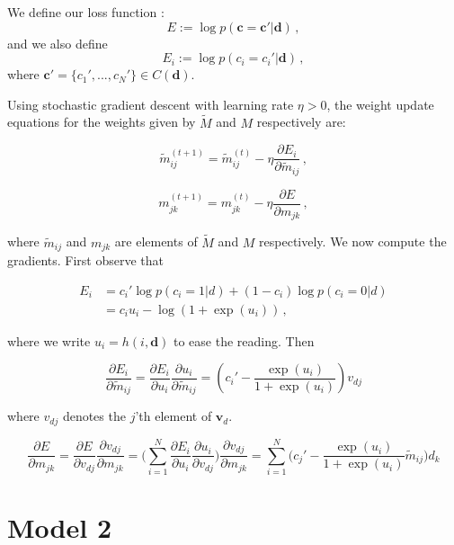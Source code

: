 \documentclass[12pt]{article}\pagestyle{myheadings}
\newcommand{\M}{\tilde{M}}
\newcommand{\tmij}{\tilde{m}_{ij}}
\newcommand{\mjk}{{m}_{jk}}
\newcommand{\boldc}{\boldsymbol c}
\newcommand{\boldd}{\boldsymbol d}
\newcommand{\boldvd}{\boldsymbol v_d}
\begin{document}
We define our loss function :
\begin{equation}
E := \log p(\boldc = \boldc'|\boldd) \,,
\end{equation}
and we also define
\begin{equation}
E_i := \log  p(c_i = c_i'|  \boldd) \,,
\end{equation} 
where $\boldc'= \{c_1',...,c_N'\} \in C(\boldd)$.

Using stochastic gradient descent with learning rate $\eta > 0$, the weight update equations for the weights given by $\M$ and $M$ respectively are:

\[
\tmij^{(t+1)} = \tmij^{(t)} - \eta \frac{\partial E_i}{\partial \tmij} \,,
\]

\[
\mjk^{(t+1)} = \mjk^{(t)} - \eta \frac{\partial E}{\partial \mjk} \,,
\]

where $\tmij$ and $\mjk$ are elements of $\M$ and $M$ respectively.
We now compute the gradients. First observe that

\[
\begin{split}
E_i &= c_i' \log p(c_i = 1 | d) + (1-c_i) \log p(c_i = 0 | d)\\
&= c_i u_i - \log(1 + \exp(u_i)) \,,
\end{split}
\]

where we write $u_i = h(i,\boldd)$ to ease the reading. Then 

\[ 
\frac{\partial E_i}{\partial \tmij} = \dfrac{\partial E_i}{\partial u_i} \dfrac{\partial u_i}{\partial \tmij} = (c_i' - \frac{\exp(u_i)}{1 + \exp(u_i)}) v_{dj}
\]

where $v_{dj}$ denotes the $j$'th element of $\boldvd$.


\[ 
\frac{\partial E}{\partial \mjk} = \dfrac{\partial E}{\partial v_{dj}} \dfrac{\partial v_{dj}}{\partial \mjk} = \big(\sum_{i=1}^N \dfrac{\partial E_i}{\partial u_i} \dfrac{\partial u_i}{\partial v_{dj}}\big) \dfrac{\partial v_{dj}}{\partial \mjk} = \sum_{i=1}^N \big( c_j' - \frac{\exp(u_i)}{1 + \exp(u_i)} \tmij \big) d_k
\]

\section{Model 2}



 
\end{document}
